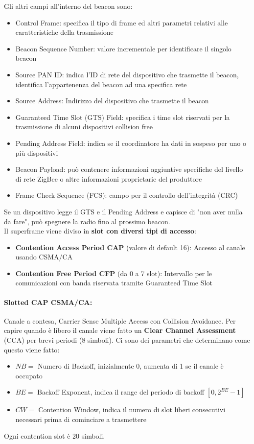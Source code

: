 Gli altri campi all'interno del beacon sono: 
\begin{itemize}
	\item Control Frame: specifica il tipo di frame ed altri parametri relativi alle caratteristiche della trasmissione
	\item Beacon Sequence Number: valore incrementale per identificare il singolo beacon
	\item Source PAN ID: indica l'ID di rete del dispositivo che trasmette il beacon, identifica l'appartenenza del beacon ad una specifica rete
	\item Source Address: Indirizzo del dispositivo che trasmette il beacon
	\item Guaranteed Time Slot (GTS) Field: specifica i time slot riservati per la trasmissione di alcuni dispositivi collision free
	\item Pending Address Field: indica se il coordinatore ha dati in sospeso per uno o più dispositivi
	\item Beacon Payload: può contenere informazioni aggiuntive specifiche del livello di rete ZigBee o altre informazioni proprietarie del produttore
	\item Frame Check Sequence (FCS): campo per il controllo dell'integrità (CRC)
\end{itemize}

Se un dispositivo legge il GTS e il Pending Address e capisce di "non aver nulla da fare", può spegnere la radio fino al prossimo beacon.\\

Il superframe viene diviso in \textbf{slot con diversi tipi di accesso}:
\begin{itemize}
	\item \textbf{Contention Access Period CAP} (valore di default 16): Accesso al canale usando CSMA/CA
	\item \textbf{Contention Free Period CFP} (da 0 a 7 slot): Intervallo per le comunicazioni con banda riservata tramite Guaranteed Time Slot
\end{itemize}

\newpage

\paragraph{Slotted CAP CSMA/CA:} Canale a contesa, Carrier Sense Multiple Access con Collision Avoidance. Per capire quando è libero il canale viene fatto un \textbf{Clear Channel Assessment} (CCA) per brevi periodi (8 simboli). Ci sono dei parametri che determinano come questo viene fatto:
\begin{itemize}
	\item $NB=$ Numero di Backoff, inizialmente 0, aumenta di 1 se il canale è occupato
	\item $BE=$ Backoff Exponent, indica il range del periodo di backoff $[0, 2^{BE} - 1]$
	\item $CW=$ Contention Window, indica il numero di slot liberi consecutivi necessari prima di cominciare a trasmettere
\end{itemize}
Ogni contention slot è 20 simboli.\\

